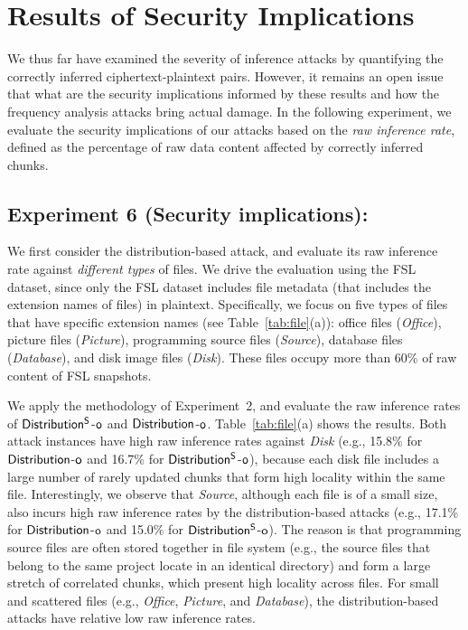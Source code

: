 \section{Results of Security Implications}
\label{sec:case}
We thus far have examined the severity of inference attacks by quantifying the
correctly inferred ciphertext-plaintext pairs.  However, it remains an open
issue that what are the security implications informed by these results and
how the frequency analysis attacks bring actual damage. In the following
experiment, we evaluate the security implications of our attacks based on the
{\em raw inference rate}, defined as the percentage of raw data content
affected by correctly inferred chunks.   




\subsection{Experiment 6 (Security implications):}
We first consider the distribution-based attack, and evaluate its raw
inference rate against {\em different types} of files. We drive the evaluation
using the FSL dataset, since only the FSL dataset includes file metadata (that
includes the extension names of files) in plaintext. Specifically, we focus on
five types of files that have specific extension names (see
Table~\ref{tab:file}(a)): office files ({\em Office}), picture files 
({\em Picture}), programming source files ({\em Source}), database files 
({\em Database}), and disk image files ({\em Disk}). These files occupy more
than 60\% of raw content of FSL snapshots.   

We apply the methodology of Experiment~2, and evaluate the raw inference
rates of $\sf Distribution^S$-$\sf o$ and $\sf Distribution$-$\sf o$. 
Table~\ref{tab:file}(a) shows the results. Both attack instances have high raw
inference rates against {\em Disk} (e.g., 15.8\% for 
$\sf Distribution$-$\sf o$ and 16.7\% for $\sf Distribution^S$-$\sf o$),
because each disk file includes a large number of rarely updated chunks that
form high locality within the same file. Interestingly, we observe that 
{\em Source}, although each file is of a small size, also incurs high raw
inference rates by the distribution-based attacks (e.g., 17.1\% for 
$\sf Distribution$-$\sf o$ and 15.0\% for $\sf Distribution^S$-$\sf o$). The
reason is that programming source files are often stored together in file system
(e.g., the source files that belong to the same project locate in an identical
directory) and form a large stretch of correlated chunks, which present high
locality across files. For small and scattered files (e.g., {\em Office}, 
{\em Picture}, and {\em Database}), the distribution-based attacks have
relative low raw inference rates.     


